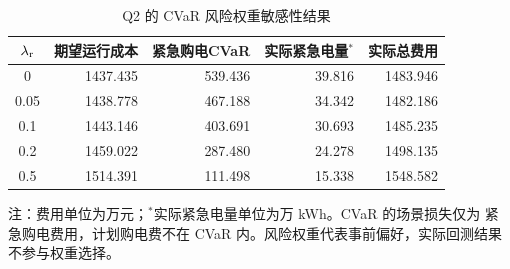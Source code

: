 \begin{table}[H]
  \centering
  \caption{Q2 的 CVaR 风险权重敏感性结果}
  \label{tab:p2-cvar-sweep}
  \small
  \setlength{\tabcolsep}{5pt}
  \begin{tabular}{crrrr}
    \toprule
    $\lambda_{\rm r}$ & 期望运行成本 & 紧急购电CVaR & 实际紧急电量$^{*}$ & 实际总费用 \\
    \midrule
    0 & 1437.435 & 539.436 & 39.816 & 1483.946 \\
    0.05 & 1438.778 & 467.188 & 34.342 & 1482.186 \\
    0.1 & 1443.146 & 403.691 & 30.693 & 1485.235 \\
    0.2 & 1459.022 & 287.480 & 24.278 & 1498.135 \\
    0.5 & 1514.391 & 111.498 & 15.338 & 1548.582 \\
    \bottomrule
  \end{tabular}
  \vspace{2pt}
  \begin{minipage}{0.96\textwidth}
    \footnotesize 注：费用单位为万元；$^{*}$实际紧急电量单位为万 kWh。CVaR 的场景损失仅为
    紧急购电费用，计划购电费不在 CVaR 内。风险权重代表事前偏好，实际回测结果不参与权重选择。
  \end{minipage}
\end{table}
